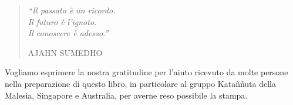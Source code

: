 \cleartorecto
\thispagestyle{empty}

\mbox{}\vfill

\vspace*{-2\baselineskip}

\begin{verse}

{\itshape
``Il passato è un ricordo.\\
Il futuro è l'ignoto.\\
Il conoscere è adesso.''}
\bigskip

{\upshape\fontsize{9}{12}\selectfont
\MakeUppercase{Ajahn Sumedho}}

\end{verse}

\vfill\mbox{}

\clearpage
\thispagestyle{empty}

\mbox{}\vfill

{\centering
Vogliamo esprimere la nostra gratitudine per l'aiuto ricevuto da molte
persone nella preparazione di questo libro, in particolare al gruppo
Kataññuta della Malesia, Singapore e Australia, per averne reso
possibile la stampa.
\par}

\vfill\mbox{}